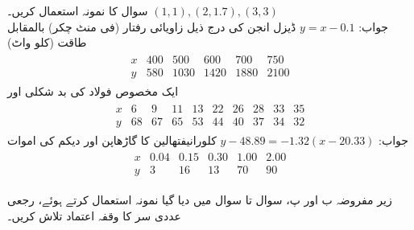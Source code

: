 \quad
سوال  کا نمونہ استعمال کریں۔
\quad
$(1,1),(2,1.7),(3,3)$\\
جواب:\quad
$y=x-0.1$
\quad
ڈیزل انجن کی درج ذیل زاویائی رفتار  (فی منٹ چکر) بالمقابل طاقت  (کلو واٹ)
\begin{align*}
\begin{array}{c|ccccc}
x&400&500&600&700&750\\
\hline
y&580&1030&1420&1880&2100
\end{array}
\end{align*}
\quad
ایک مخصوص فولاد کی بد شکلی  اور   
\begin{align*}
\begin{array}{c|ccccccccc}
x&6&9&11&13&22&26&28&33&35\\
\hline
y&68&67&65&53&44&40&37&34&32
\end{array}
\end{align*}
جواب:\quad
$y-48.89=-1.32(x-20.33)$
\quad
کلورانیفتھالین کا گاڑھاپن  اور دیکم کی اموات 
\begin{align*}
\begin{array}{c|ccccc}
x&0.04&0.15&0.30&1.00&2.00\\
\hline
y&3&16&13&70&90
\end{array}
\end{align*}

 زیر  مفروضہ ب اور پ، سوال  تا سوال  میں  دیا گیا نمونہ استعمال کرتے ہوئے، رجعی عددی سر  کا  وقفہ اعتماد تلاش کریں۔

